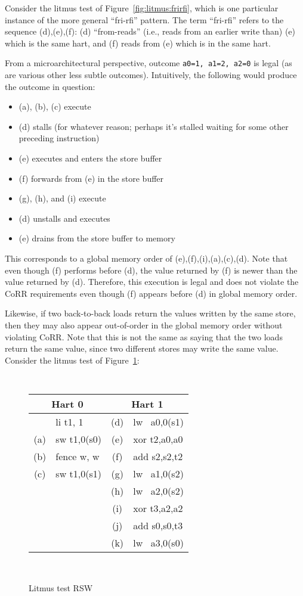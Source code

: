 Consider the litmus test of Figure~\ref{fig:litmus:frirfi}, which is one particular instance of the more general ``fri-rfi'' pattern.
The term ``fri-rfi'' refers to the sequence (d),(e),(f): (d) ``from-reads'' (i.e., reads from an earlier write than) (e) which is the same hart, and (f) reads from (e) which is in the same hart.

From a microarchitectural perspective, outcome {\tt a0=1, a1=2, a2=0} is legal (as are various other less subtle outcomes).  Intuitively, the following would produce the outcome in question:
\begin{itemize}
  \item (a), (b), (c) execute
  \item (d) stalls (for whatever reason; perhaps it's stalled waiting for some other preceding instruction)
  \item (e) executes and enters the store buffer
  \item (f) forwards from (e) in the store buffer
  \item (g), (h), and (i) execute
  \item (d) unstalls and executes
  \item (e) drains from the store buffer to memory
\end{itemize}
This corresponds to a global memory order of (e),(f),(i),(a),(c),(d).
Note that even though (f) performs before (d), the value returned by (f) is newer than the value returned by (d).
Therefore, this execution is legal and does not violate the CoRR requirements even though (f) appears before (d) in global memory order.

Likewise, if two back-to-back loads return the values written by the same store, then they may also appear out-of-order in the global memory order without violating CoRR.  Note that this is not the same as saying that the two loads return the same value, since two different stores may write the same value.   Consider the litmus test of Figure~\ref{fig:litmus:rsw}:

\begin{figure}[h!]
  \centering
  {
    \tt\small
    \begin{tabular}{cl||cl}
    \multicolumn{2}{c}{Hart 0} & \multicolumn{2}{c}{Hart 1} \\
    \hline
          & li t1, 1    & (d) & lw~ a0,0(s1) \\
      (a) & sw t1,0(s0) & (e) & xor t2,a0,a0 \\
      (b) & fence w, w  & (f) & add s2,s2,t2 \\
      (c) & sw t1,0(s1) & (g) & lw~ a1,0(s2) \\
          &             & (h) & lw~ a2,0(s2) \\
          &             & (i) & xor t3,a2,a2 \\
          &             & (j) & add s0,s0,t3 \\
          &             & (k) & lw~ a3,0(s0) \\
    \end{tabular}
  }
  ~~~~
  \diagram
  \caption{Litmus test RSW}
  \label{fig:litmus:rsw}
\end{figure}

